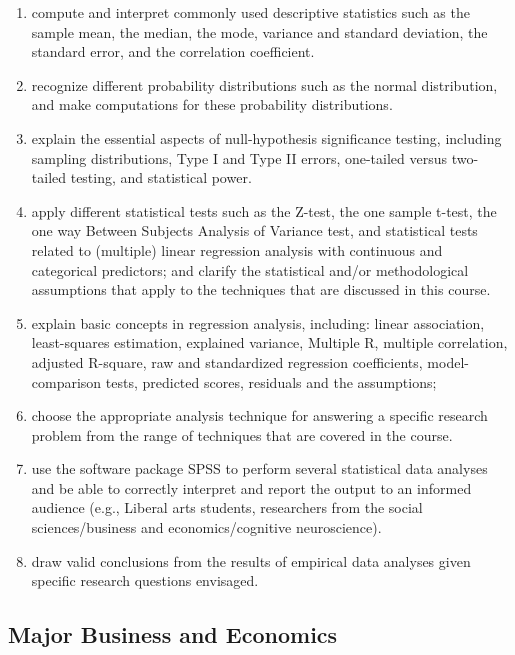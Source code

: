 \documentclass[
  letterpaper,
]{scrbook}
\providecommand{\tightlist}{%
  \setlength{\itemsep}{0pt}\setlength{\parskip}{0pt}}\usepackage{longtable,booktabs,array}
\begin{document}
\begin{enumerate}
\def\labelenumi{\arabic{enumi}.}
\tightlist
\item
  compute and interpret commonly used descriptive statistics such as the
  sample mean, the median, the mode, variance and standard deviation,
  the standard error, and the correlation coefficient.
\item
  recognize different probability distributions such as the normal
  distribution, and make computations for these probability
  distributions.
\item
  explain the essential aspects of null-hypothesis significance testing,
  including sampling distributions, Type I and Type II errors,
  one-tailed versus two-tailed testing, and statistical power.
\item
  apply different statistical tests such as the Z-test, the one sample
  t-test, the one way Between Subjects Analysis of Variance test, and
  statistical tests related to (multiple) linear regression analysis
  with continuous and categorical predictors; and clarify the
  statistical and/or methodological assumptions that apply to the
  techniques that are discussed in this course.
\item
  explain basic concepts in regression analysis, including: linear
  association, least-squares estimation, explained variance, Multiple R,
  multiple correlation, adjusted R-square, raw and standardized
  regression coefficients, model-comparison tests, predicted scores,
  residuals and the assumptions;
\item
  choose the appropriate analysis technique for answering a specific
  research problem from the range of techniques that are covered in the
  course.
\item
  use the software package SPSS to perform several statistical data
  analyses and be able to correctly interpret and report the output to
  an informed audience (e.g., Liberal arts students, researchers from
  the social sciences/business and economics/cognitive neuroscience).
\item
  draw valid conclusions from the results of empirical data analyses
  given specific research questions envisaged.
\end{enumerate}

\hypertarget{major-business-and-economics}{%
\subsection*{Major Business and
Economics}\label{major-business-and-economics}}
\end{document}
